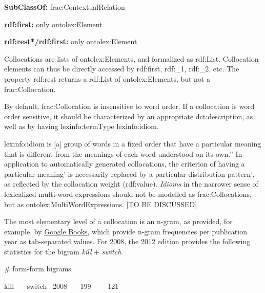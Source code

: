 \documentclass[a4paper]{article}
\newcommand\textstyleInternetlink[1]{\textcolor[rgb]{0.0,0.0,0.5019608}{#1}}
\newcommand\textstyleSourceText[1]{\textrm{#1}}
\newcommand\textstyleStrongEmphasis[1]{\textbf{#1}}
\newcommand\textstyleTeletype[1]{\textrm{#1}}
\begin{document}
\textstyleStrongEmphasis{SubClassOf:} \textstyleTeletype{frac:ContextualRelation}

\textstyleStrongEmphasis{rdf:first:} only \textstyleTeletype{ontolex:Element}

\textstyleStrongEmphasis{rdf:rest*/rdf:first:} only \textstyleTeletype{ontolex:Element} 

Collocations are lists of ontolex:Elements, and formalized as \textstyleTeletype{rdf:List}. Collocation elements can thus be directly accessed by \textstyleTeletype{rdf:first}, \textstyleTeletype{rdf:\_1}, \textstyleTeletype{rdf:\_2}, etc. The property \textstyleTeletype{rdf:rest} returns a \textstyleTeletype{rdf:List} of \textstyleTeletype{ontolex:Element}s, but not a \textstyleTeletype{frac:Collocation}.

By default, \textstyleTeletype{frac:Collocation} is insensitive to word order. If a collocation is word order sensitive, it should be characterized by an appropriate \textstyleTeletype{dct:description}, as well as by having \textstyleTeletype{lexinfo:termType lexinfo:idiom}.

\textstyleTeletype{lexinfo:idiom} is {\textasciigrave}{\textasciigrave}[a] group of words in a fixed order that have a particular meaning that is different from the meanings of each word understood on its own.'{}' In application to automatically generated collocations, the criterion of having {\textasciigrave}a particular meaning' is necessarily replaced by {\textasciigrave}a particular distribution pattern', as reflected by the collocation weight (\textstyleTeletype{rdf:value}). \textit{Idioms} in the narrower sense of lexicalized multi-word expressions should not be modelled as \textstyleTeletype{frac:Collocation}s, but as \textstyleTeletype{ontolex:MultiWordExpression}s. [TO BE DISCUSSED] 

The most elementary level of a collocation is an n-gram, as provided, for example, by \href{http://storage.googleapis.com/books/ngrams/books/datasetsv2.html}{\textstyleInternetlink{Google Books}}, which provide n-gram frequencies per publication year as tab-separated values. For 2008, the 2012 edition provides the following statistics for the bigram \textit{kill} + \textit{switch}. 


\bigskip

\textstyleSourceText{\# form-form bigrams}

\textstyleSourceText{kill \ \ \ switch \ 2008 \ \ \ 199 \ \ \ \ 121}


\bigskip
\end{document}
